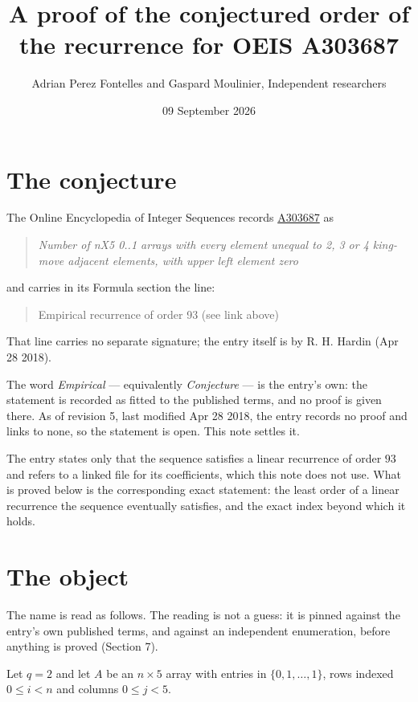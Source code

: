 \documentclass[11pt]{article}
\title{A proof of the conjectured order of the recurrence for OEIS A303687}
\author{Adrian Perez Fontelles and Gaspard Moulinier, Independent researchers}
\date{09 September 2026}
\theoremstyle{definition}
\begin{document}
\maketitle
\section{The conjecture}

The Online Encyclopedia of Integer Sequences records \href{https://oeis.org/A303687}{A303687} as

\begin{quote}\itshape Number of nX5 0..1 arrays with every element unequal to 2, 3 or 4 king-move adjacent elements, with upper left element zero\end{quote}

and carries in its Formula section the line:

\begin{quote}\ttfamily Empirical recurrence of order 93 (see link above)\end{quote}

That line carries no separate signature; the entry itself is by R. H. Hardin (Apr 28 2018).

The word {\itshape Empirical} --- equivalently {\itshape Conjecture} --- is the entry's own: the statement is recorded as fitted to the published terms, and no proof is given there. As of revision 5, last modified Apr 28 2018, the entry records no proof and links to none, so the statement is open. This note settles it.

The entry states only that the sequence satisfies a linear recurrence of order $93$ and refers to a linked file for its coefficients, which this note does not use. What is proved below is the corresponding exact statement: the least order of a linear recurrence the sequence eventually satisfies, and the exact index beyond which it holds.

\section{The object}

The name is read as follows. The reading is not a guess: it is pinned against the entry's own published terms, and against an independent enumeration, before anything is proved (Section 7).

Let $q = 2$ and let $A$ be an $n \times 5$ array with entries in $\{0,1,\dots,1\}$, rows indexed $0 \le i < n$ and columns $0 \le j < 5$.
\end{document}
